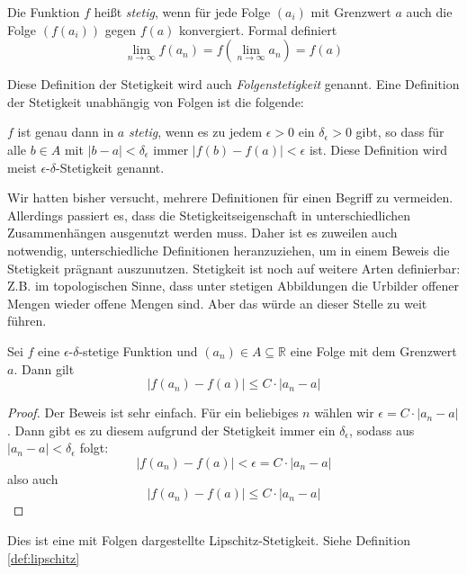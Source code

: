 \begin{definition}
Die Funktion $f$ heißt \emph{stetig}, wenn für jede Folge $(a_i)$ mit Grenzwert $a$ auch die Folge $(f(a_i))$ gegen $f(a)$ konvergiert. Formal definiert
\[
\lim_{n\rightarrow \infty} f(a_n) = f(\lim_{n\rightarrow \infty} a_n) = f(a)
\]
\end{definition}

Diese Definition der Stetigkeit wird auch \emph{Folgenstetigkeit} genannt. Eine Definition der Stetigkeit unabhängig von Folgen ist die folgende: 

\begin{definition}
$f$ ist genau dann in $a$ \emph{stetig}, wenn es zu jedem $\epsilon>0$ ein $\delta_\epsilon > 0$ gibt, so dass für alle $b\in A$ mit $\vert b-a\vert < \delta_\epsilon $ immer $\vert f(b)-f(a)\vert < \epsilon$ ist. Diese Definition wird meist $\epsilon$-$\delta$-Stetigkeit genannt. 
\end{definition}

Wir hatten bisher versucht, mehrere Definitionen für einen Begriff zu vermeiden. Allerdings passiert es, dass die Stetigkeitseigenschaft in unterschiedlichen Zusammenhängen ausgenutzt werden muss. Daher ist es zuweilen auch notwendig, unterschiedliche Definitionen heranzuziehen, um in einem Beweis die Stetigkeit prägnant auszunutzen. Stetigkeit ist noch auf weitere Arten definierbar: Z.B. im topologischen Sinne, dass unter stetigen Abbildungen die Urbilder offener Mengen wieder offene Mengen sind. Aber das würde an dieser Stelle zu weit führen.

\begin{lemma}\label{lem:stetig}
Sei $f$ eine $\epsilon$-$\delta$-stetige Funktion und $(a_n)\in A \subseteq \mathbb{R}$ eine Folge mit dem Grenzwert $a$. Dann gilt
\[
|f(a_n)-f(a)| \le C\cdot |a_n -a|
\]
\end{lemma}
\begin{proof}
Der Beweis ist sehr einfach. Für ein beliebiges $n$ wählen wir $\epsilon = C\cdot |a_n -a|$. Dann gibt es zu diesem aufgrund der Stetigkeit immer ein $\delta_\epsilon$, sodass aus $|a_n-a|<\delta_\epsilon$ folgt:
\[
|f(a_n)-f(a)| < \epsilon = C\cdot |a_n -a|
\]
also auch
\[
|f(a_n)-f(a)| \le C\cdot |a_n -a|
\]
\end{proof}

\begin{remark}
Dies ist eine mit Folgen dargestellte Lipschitz-Stetigkeit. Siehe Definition \ref{def:lipschitz}
\end{remark}

